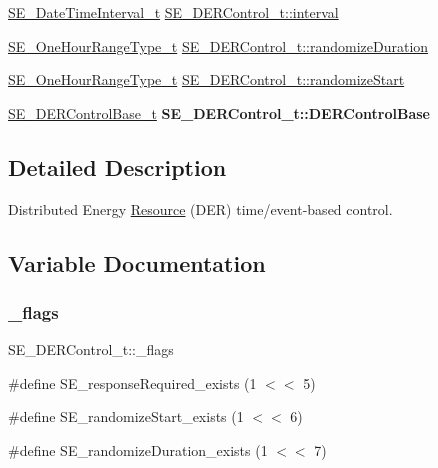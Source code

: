 \begin{DoxyCompactItemize}
\item 
\hyperlink{structSE__DateTimeInterval__t}{S\+E\+\_\+\+Date\+Time\+Interval\+\_\+t} \hyperlink{group__DERControl_ga3608bd0d2649c03622fa27b33c5f9f8a}{S\+E\+\_\+\+D\+E\+R\+Control\+\_\+t\+::interval}
\item 
\hyperlink{group__OneHourRangeType_ga2b9c57435b20a5fc0689922b77e97c2d}{S\+E\+\_\+\+One\+Hour\+Range\+Type\+\_\+t} \hyperlink{group__DERControl_ga2c4d801840699ca2af4d15228ec2b92a}{S\+E\+\_\+\+D\+E\+R\+Control\+\_\+t\+::randomize\+Duration}
\item 
\hyperlink{group__OneHourRangeType_ga2b9c57435b20a5fc0689922b77e97c2d}{S\+E\+\_\+\+One\+Hour\+Range\+Type\+\_\+t} \hyperlink{group__DERControl_ga0570665f45427d3bea85bb34ba79d77e}{S\+E\+\_\+\+D\+E\+R\+Control\+\_\+t\+::randomize\+Start}
\item 
\mbox{\label{group__DERControl_gaf990cdb4a783597a1922534510e19c35}} 
\hyperlink{structSE__DERControlBase__t}{S\+E\+\_\+\+D\+E\+R\+Control\+Base\+\_\+t} {\bfseries S\+E\+\_\+\+D\+E\+R\+Control\+\_\+t\+::\+D\+E\+R\+Control\+Base}
\end{DoxyCompactItemize}


\subsection{Detailed Description}
Distributed Energy \hyperlink{structResource}{Resource} (D\+ER) time/event-\/based control. 

\subsection{Variable Documentation}
\mbox{\label{group__DERControl_ga52dda811cfca73e6781ad02d31086a65}} 
\subsubsection{\texorpdfstring{\+\_\+flags}{\_flags}}
{\footnotesize\ttfamily S\+E\+\_\+\+D\+E\+R\+Control\+\_\+t\+::\+\_\+flags}

\#define S\+E\+\_\+response\+Required\+\_\+exists (1 $<$$<$ 5)

\#define S\+E\+\_\+randomize\+Start\+\_\+exists (1 $<$$<$ 6)

\#define S\+E\+\_\+randomize\+Duration\+\_\+exists (1 $<$$<$ 7) \mbox{\label{group__DERControl_ga9d5738589e0b4a269f3f845eb6f5f730}} 
